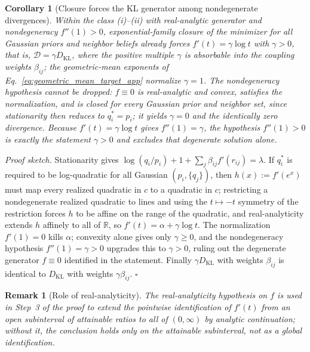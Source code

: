 \documentclass[11pt]{article}
\newtheorem{corollary}{Corollary}
\newtheorem{remark}{Remark}
\begin{document}
\begin{corollary}[Closure forces the KL generator among nondegenerate divergences]
\label{cor:closure_forces_kl}
Within the class (i)--(ii) with real-analytic generator and nondegeneracy $f''(1) > 0$, exponential-family closure of the minimizer for all Gaussian priors and neighbor beliefs already forces $f'(t) = \gamma \log t$ with $\gamma > 0$, that is, $\mathcal{D} = \gamma D_{\mathrm{KL}}$, where the positive multiple $\gamma$ is absorbable into the coupling weights $\beta_{ij}$; the geometric-mean exponents of Eq.~\eqref{eq:geometric_mean_target_app} normalize $\gamma = 1$. The nondegeneracy hypothesis cannot be dropped: $f \equiv 0$ is real-analytic and convex, satisfies the normalization, and is closed for every Gaussian prior and neighbor set, since stationarity then reduces to $q_i^* = p_i$; it yields $\gamma = 0$ and the identically zero divergence. Because $f'(t) = \gamma \log t$ gives $f''(1) = \gamma$, the hypothesis $f''(1) > 0$ is exactly the statement $\gamma > 0$ and excludes that degenerate solution alone.
\end{corollary}

\emph{Proof sketch.} Stationarity gives $\log(q_i/p_i) + 1 + \sum_j \beta_{ij} f'(r_{ij}) = \lambda$. If $q_i^*$ is required to be log-quadratic for all Gaussian $(p_i, \{q_j\})$, then $h(x) := f'(e^x)$ must map every realized quadratic in $c$ to a quadratic in $c$; restricting a nondegenerate realized quadratic to lines and using the $t \mapsto -t$ symmetry of the restriction forces $h$ to be affine on the range of the quadratic, and real-analyticity extends $h$ affinely to all of $\mathbb{R}$, so $f'(t) = \alpha + \gamma\log t$. The normalization $f'(1) = 0$ kills $\alpha$; convexity alone gives only $\gamma \ge 0$, and the nondegeneracy hypothesis $f''(1) = \gamma > 0$ upgrades this to $\gamma > 0$, ruling out the degenerate generator $f \equiv 0$ identified in the statement. Finally $\gamma D_{\mathrm{KL}}$ with weights $\beta_{ij}$ is identical to $D_{\mathrm{KL}}$ with weights $\gamma\beta_{ij}$. \hfill $\square$

\begin{remark}[Role of real-analyticity]
\label{rem:analyticity_role}
The real-analyticity hypothesis on $f$ is used in Step~3 of the proof to extend the pointwise identification of $f'(t)$ from an open subinterval of attainable ratios to all of $(0, \infty)$ by analytic continuation; without it, the conclusion holds only on the attainable subinterval, not as a global identification.
\end{remark}
\end{document}
